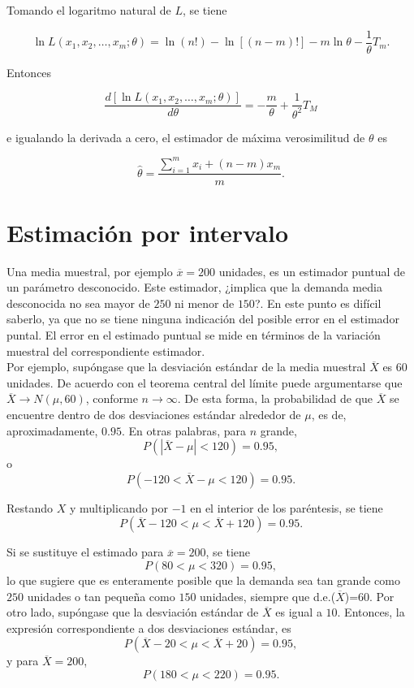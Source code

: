 Tomando el logaritmo natural de $L$, se tiene

$$\ln L(x_1,x_2,\ldots,x_m; \theta) = \ln(n!)-\ln\left[(n-m)!\right]-m\ln\theta -\dfrac{1}{\theta}T_m.$$

Entonces

$$\dfrac{d\left[\ln L(x_1,x_2,\ldots,x_m; \theta)\right]}{d\theta}=-\dfrac{m}{\theta}+\dfrac{1}{\theta^2}T_M$$

e igualando la derivada a cero, el estimador de máxima verosimilitud de $\theta$ es

$$\hat{\theta}=\dfrac{\displaystyle\sum_{i=1}^m x_i+(n-m)x_m}{m}.$$


\section{Estimación por intervalo}
Una media muestral, por ejemplo $\overline{x}=200$ unidades, es un estimador puntual de un parámetro desconocido. Este estimador, ¿implica que la demanda media desconocida no sea mayor de $250$ ni menor de $150$?. En este punto es difícil saberlo, ya que no se tiene ninguna indicación del posible error en el estimador puntal. El error en el estimado puntual se mide en términos de la variación muestral del correspondiente estimador.\\

Por ejemplo, supóngase que la desviación estándar de la media muestral $\overline{X}$ es $60$ unidades. De acuerdo con el teorema central del límite puede argumentarse que $\overline{X}\to N(\mu,60)$, conforme $n\to \infty$. De esta forma, la probabilidad de que $\overline{X}$ se encuentre dentro de dos desviaciones estándar alrededor de $\mu$, es de, aproximadamente, $0.95$. En otras palabras, para $n$ grande,
$$P(|\overline{X}-\mu|<120)=0.95,$$
o
$$P(-120<\overline{X}-\mu<120)=0.95.$$

Restando $X$ y multiplicando por $-1$ en el interior de los paréntesis, se tiene
$$P(\overline{X}-120<\mu<\overline{X}+120)=0.95.$$

Si se sustituye el estimado para $\overline{x}=200$, se tiene
$$P(80<\mu<320)=0.95,$$
lo que sugiere que es enteramente posible que la demanda sea tan grande como $250$ unidades o tan pequeña como $150$ unidades, siempre que d.e.($\overline{X}$)=60. Por otro lado, supóngase que la desviación estándar de $\overline{X}$ es igual a $10$. Entonces, la expresión correspondiente a dos desviaciones estándar, es
$$P(\overline{X}-20<\mu<\overline{X}+20)=0.95,$$
y para $\overline{X}=200$, 
$$P(180<\mu<220)=0.95.$$

